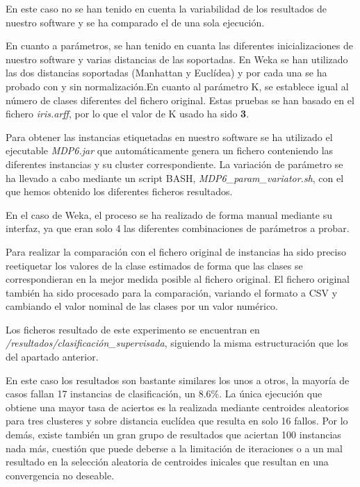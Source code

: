 \documentclass[a4paper]{report}
\begin{document}
	En este caso no se han tenido en cuenta la variabilidad de los resultados de nuestro software y se ha comparado el de una sola ejecución.
	
	En cuanto a parámetros, se han tenido en cuanta las diferentes inicializaciones de nuestro software y varias distancias de las soportadas. En Weka se han utilizado las dos distancias soportadas (Manhattan y Euclídea) y por cada una se ha probado con y sin normalización.En cuanto al parámetro K, se establece igual al número de clases diferentes del fichero original. Estas pruebas se han basado en el fichero \textit{iris.arff}, por lo que el valor de K usado ha sido \textbf{3}.
	
	Para obtener las instancias etiquetadas en nuestro software se ha utilizado el ejecutable \textit{MDP6.jar} que automáticamente genera un fichero conteniendo las diferentes instancias y su cluster correspondiente. La variación de parámetro se ha llevado a cabo mediante un script BASH, \textit{MDP6\_param\_variator.sh},  con el que hemos obtenido los diferentes ficheros resultados.
	
	En el caso de Weka, el proceso se ha realizado de forma manual mediante su interfaz, ya que eran solo 4 las diferentes combinaciones de parámetros a probar.
	
	Para realizar la comparación con el fichero original de instancias ha sido preciso reetiquetar los valores de la clase estimados de forma que las clases se correspondieran en la mejor medida posible al fichero original. El fichero original también ha sido procesado para la comparación, variando el formato a CSV y cambiando el valor nominal de las clases por un valor numérico.
	
	Los ficheros resultado de este experimento se encuentran en \textit{/resultados/clasificación\_supervisada}, siguiendo la misma estructuración que los del apartado anterior.
	
	En este caso los resultados son bastante similares los unos a otros, la mayoría de casos fallan 17 instancias de clasificación, un 8.6\%. La única ejecución que obtiene una mayor tasa de aciertos es la realizada mediante centroides aleatorios para tres clusteres y sobre distancia euclídea que resulta en solo 16 fallos. Por lo demás, existe también un gran grupo de resultados que aciertan 100 instancias nada más, cuestión que puede deberse a la limitación de iteraciones o a un mal resultado en la selección aleatoria de centroides inicales que resultan en una convergencia no deseable.
	
\end{document}
